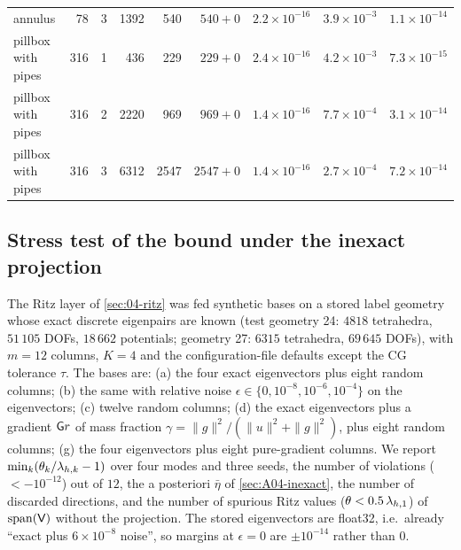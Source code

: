 \begin{table}[t]
\begin{tabular}{@{}lrrrrrccc@{}}
annulus & 78 & 3 & 1392 & 540 & $540+0$ & $2.2\!\times\!10^{-16}$ & $3.9\!\times\!10^{-3}$ & $1.1\!\times\!10^{-14}$ \\
pillbox with pipes & 316 & 1 & 436 & 229 & $229+0$ & $2.4\!\times\!10^{-16}$ & $4.2\!\times\!10^{-3}$ & $7.3\!\times\!10^{-15}$ \\
pillbox with pipes & 316 & 2 & 2220 & 969 & $969+0$ & $1.4\!\times\!10^{-16}$ & $7.7\!\times\!10^{-4}$ & $3.1\!\times\!10^{-14}$ \\
pillbox with pipes & 316 & 3 & 6312 & 2547 & $2547+0$ & $1.4\!\times\!10^{-16}$ & $2.7\!\times\!10^{-4}$ & $7.2\!\times\!10^{-14}$ \\
\bottomrule
\end{tabular}
\end{table}

\subsection{Stress test of the bound under the inexact projection}\label{sec:A04-stress}

The Ritz layer of \cref{sec:04-ritz} was fed synthetic bases on a stored label geometry whose exact discrete eigenpairs are known (test geometry 24: $4818$ tetrahedra, $51\,105$ DOFs, $18\,662$ potentials; geometry 27: $6315$ tetrahedra, $69\,645$ DOFs), with $m=12$ columns, $K=4$ and the configuration-file defaults except the CG tolerance $\tau$.
The bases are: (a) the four exact eigenvectors plus eight random columns; (b) the same with relative noise $\epsilon\in\{0,10^{-8},10^{-6},10^{-4}\}$ on the eigenvectors; (c) twelve random columns; (d) the exact eigenvectors plus a gradient $\mathsf{G} r$ of mass fraction $\gamma=\|g\|^2/(\|u\|^2+\|g\|^2)$, plus eight random columns; (g) the four eigenvectors plus eight pure-gradient columns.
We report $\min_k(\theta_k/\lamh_k-1)$ over four modes and three seeds, the number of violations ($<-10^{-12}$) out of $12$, the a posteriori $\bar\eta$ of \cref{sec:A04-inexact}, the number of discarded directions, and the number of spurious Ritz values ($\theta<0.5\,\lamh_1$) of $\operatorname{span}(\mathsf{V})$ without the projection.
The stored eigenvectors are float32, i.e.\ already ``exact plus $6\times10^{-8}$ noise'', so margins at $\epsilon=0$ are $\pm10^{-14}$ rather than $0$.

